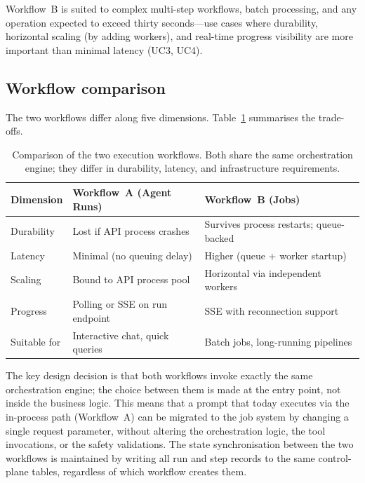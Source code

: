 \documentclass[a4paper]{sapthesis}
\begin{document}
Workflow~B is suited to complex multi-step workflows, batch processing,
and any operation expected to exceed thirty seconds---use cases where
durability, horizontal scaling (by adding workers), and real-time
progress visibility are more important than minimal latency (UC3, UC4).

\subsection{Workflow comparison}

The two workflows differ along five dimensions.
Table~\ref{tab:workflow-comparison} summarises the trade-offs.

\begin{table}[ht]
\centering
\caption{Comparison of the two execution workflows.  Both share
the same orchestration engine; they differ in durability, latency,
and infrastructure requirements.}
\label{tab:workflow-comparison}
\small
\begin{tabularx}{\textwidth}{@{}l X X@{}}
    \hline
    \textbf{Dimension} & \textbf{Workflow~A (Agent Runs)} &
        \textbf{Workflow~B (Jobs)} \\
    \hline
    Durability &
        Lost if API process crashes &
        Survives process restarts; queue-backed \\
    Latency &
        Minimal (no queuing delay) &
        Higher (queue + worker startup) \\
    Scaling &
        Bound to API process pool &
        Horizontal via independent workers \\
    Progress &
        Polling or SSE on run endpoint &
        SSE with reconnection support \\
    Suitable for &
        Interactive chat, quick queries &
        Batch jobs, long-running pipelines \\
    \hline
\end{tabularx}
\end{table}

The key design decision is that both workflows invoke exactly the same
orchestration engine; the choice between them is made at the entry point,
not inside the business logic.  This means that a prompt that today
executes via the in-process path (Workflow~A) can be migrated to the job
system by changing a single request parameter, without altering the
orchestration logic, the tool invocations, or the safety validations.  The state synchronisation
between the two workflows is maintained by writing all run and step records
to the same control-plane tables, regardless of which workflow creates them.
\end{document}
